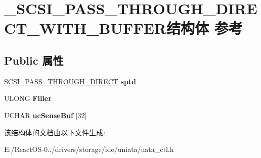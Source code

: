 \hypertarget{struct___s_c_s_i___p_a_s_s___t_h_r_o_u_g_h___d_i_r_e_c_t___w_i_t_h___b_u_f_f_e_r}{}\section{\+\_\+\+S\+C\+S\+I\+\_\+\+P\+A\+S\+S\+\_\+\+T\+H\+R\+O\+U\+G\+H\+\_\+\+D\+I\+R\+E\+C\+T\+\_\+\+W\+I\+T\+H\+\_\+\+B\+U\+F\+F\+E\+R结构体 参考}
\label{struct___s_c_s_i___p_a_s_s___t_h_r_o_u_g_h___d_i_r_e_c_t___w_i_t_h___b_u_f_f_e_r}
\subsection*{Public 属性}
\begin{DoxyCompactItemize}
\item 
\mbox{\label{struct___s_c_s_i___p_a_s_s___t_h_r_o_u_g_h___d_i_r_e_c_t___w_i_t_h___b_u_f_f_e_r_a4526a70f01d1e025e70b69d9dd657e63}} 
\hyperlink{struct___s_c_s_i___p_a_s_s___t_h_r_o_u_g_h___d_i_r_e_c_t}{S\+C\+S\+I\+\_\+\+P\+A\+S\+S\+\_\+\+T\+H\+R\+O\+U\+G\+H\+\_\+\+D\+I\+R\+E\+CT} {\bfseries sptd}
\item 
\mbox{\label{struct___s_c_s_i___p_a_s_s___t_h_r_o_u_g_h___d_i_r_e_c_t___w_i_t_h___b_u_f_f_e_r_a1ea54ffdef0db22ddb765d79bd1012ca}} 
U\+L\+O\+NG {\bfseries Filler}
\item 
\mbox{\label{struct___s_c_s_i___p_a_s_s___t_h_r_o_u_g_h___d_i_r_e_c_t___w_i_t_h___b_u_f_f_e_r_a0ccadde63b8a10027093359de5337d40}} 
U\+C\+H\+AR {\bfseries uc\+Sense\+Buf} \mbox{[}32\mbox{]}
\end{DoxyCompactItemize}


该结构体的文档由以下文件生成\+:\begin{DoxyCompactItemize}
\item 
E\+:/\+React\+O\+S-\/0../drivers/storage/ide/uniata/uata\+\_\+ctl.\+h\end{DoxyCompactItemize}
